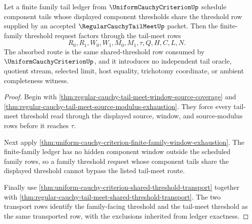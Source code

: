 

\begin{theorem}
\label{thm:regular-cauchy-tail-meet-finite-family-threshold-absorption}
Let a finite family tail ledger from $\UniformCauchyCriterionUp$ schedule component tails whose displayed component thresholds share the threshold row supplied by an accepted $\RegularCauchyTailMeetUp$ packet. Then the finite-family threshold request factors through the tail-meet rows
$$
R_0,R_1,W_0,W_1,M_0,M_1,\tau,Q,H,C,L,N.
$$
The absorbed route is the same shared-threshold row consumed by $\UniformCauchyCriterionUp$, and it introduces no independent tail oracle, quotient stream, selected limit, host equality, trichotomy coordinate, or ambient completeness witness.
\end{theorem}
\begin{proof}
Begin with \autoref{thm:regular-cauchy-tail-meet-window-source-coverage} and \autoref{thm:regular-cauchy-tail-meet-source-modulus-exhaustion}. They force every tail-meet threshold read through the displayed source, window, and source-modulus rows before it reaches $\tau$.

Next apply \autoref{thm:uniform-cauchy-criterion-finite-family-window-exhaustion}. The finite-family ledger has no hidden component window outside the scheduled family rows, so a family threshold request whose component tails share the displayed threshold cannot bypass the listed tail-meet route.

Finally use \autoref{thm:uniform-cauchy-criterion-shared-threshold-transport} together with \autoref{thm:regular-cauchy-tail-meet-shared-threshold-transport}. The two transport rows identify the family-facing threshold and the tail-meet threshold as the same transported row, with the exclusions inherited from ledger exactness.
\end{proof}

